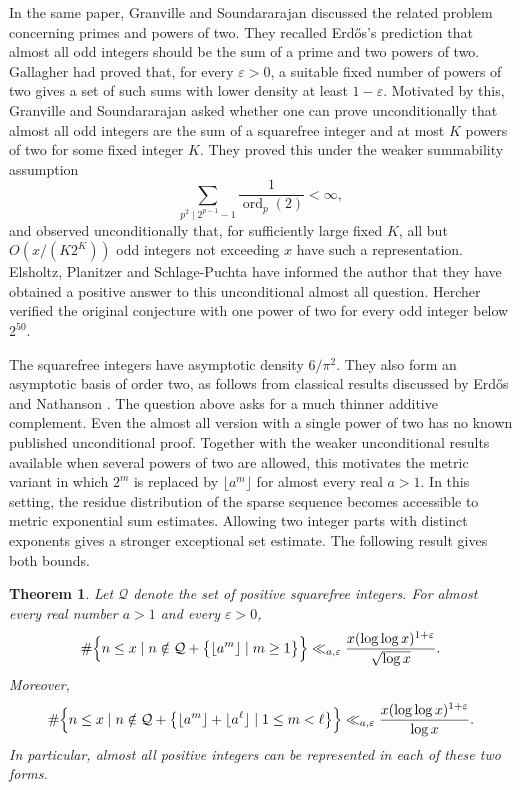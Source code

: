 \documentclass[11pt,reqno]{amsart}
\numberwithin{equation}{section}
\newtheorem{theorem}{Theorem}[section]
\begin{document}
    In the same paper, Granville and Soundararajan discussed the related problem concerning primes and powers of two. They recalled Erd\H{o}s's prediction that almost all odd integers should be the sum of a prime and two powers of two. Gallagher \cite{Gallagher} had proved that, for every $\varepsilon>0$, a suitable fixed number of powers of two gives a set of such sums with lower density at least $1-\varepsilon$. Motivated by this, Granville and Soundararajan asked whether one can prove unconditionally that almost all odd integers are the sum of a squarefree integer and at most $K$ powers of two for some fixed integer $K$. They proved this under the weaker summability assumption
    $$
    \sum_{p^2\mid 2^{p-1}-1}\frac{1}{\operatorname{ord}_p(2)}<\infty,
    $$
    and observed unconditionally that, for sufficiently large fixed $K$, all but $O(x/(K2^K))$ odd integers not exceeding $x$ have such a representation. Elsholtz, Planitzer and Schlage-Puchta have informed the author that they have obtained a positive answer to this unconditional almost all question. Hercher \cite{Hercher} verified the original conjecture with one power of two for every odd integer below $2^{50}$.

    The squarefree integers have asymptotic density $6/\pi^2$. They also form an asymptotic basis of order two, as follows from classical results discussed by Erd\H{o}s and Nathanson \cite[Introduction and Lemma 2]{ErdosNathanson}. The question above asks for a much thinner additive complement. Even the almost all version with a single power of two has no known published unconditional proof. Together with the weaker unconditional results available when several powers of two are allowed, this motivates the metric variant in which $2^m$ is replaced by $\lfloor a^m\rfloor$ for almost every real $a>1$. In this setting, the residue distribution of the sparse sequence becomes accessible to metric exponential sum estimates. Allowing two integer parts with distinct exponents gives a stronger exceptional set estimate. The following result gives both bounds.

    \begin{theorem}\label{thm-squarefree}
        Let $\mathcal{Q}$ denote the set of positive squarefree integers. For almost every real number $a>1$ and every $\varepsilon>0$,
        \begin{equation}\label{eq-squarefree-quantitative}
            \#\Bigl\{n\le x\mid n\notin \mathcal{Q}+\bigl\{\lfloor a^m\rfloor\mid m\ge1\bigr\}\Bigr\}
            \ll_{a,\varepsilon}
            \frac{x(\log\log x)^{1+\varepsilon}}{\sqrt{\log x}}.
        \end{equation}
        Moreover,
        \begin{equation}\label{eq-squarefree-two-powers}
            \#\Bigl\{n\le x\mid n\notin \mathcal{Q}+\bigl\{\lfloor a^m\rfloor+\lfloor a^\ell\rfloor\mid 1\le m<\ell\bigr\}\Bigr\}
            \ll_{a,\varepsilon}
            \frac{x(\log\log x)^{1+\varepsilon}}{\log x}.
        \end{equation}
        In particular, almost all positive integers can be represented in each of these two forms.
    \end{theorem}
\end{document}

